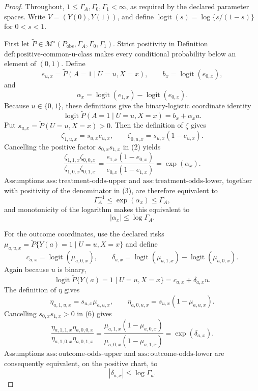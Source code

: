 \documentclass{article}
\begin{document}
\begin{proof}
Throughout, \(1\leq\Gamma_A,\Gamma_0,\Gamma_1<\infty\), as required by the declared parameter spaces.  Write \(V=(Y(0),Y(1))\), and define \(\operatorname{logit}(s)=\log\{s/(1-s)\}\) for \(0<s<1\).

First let \(\widetilde P\in\mathcal M^{\circ}(P_{\mathrm{obs}},\Gamma_A,\Gamma_0,\Gamma_1)\).  Strict positivity in Definition \(\mathrm{def{:}positive\text{-}common\text{-}u\text{-}class}\) makes every conditional probability below an element of \((0,1)\).  Define
\[
e_{u,x}=\widetilde P(A=1\mid U=u,X=x),
\qquad
b_x=\operatorname{logit}(e_{0,x}),
\]
and
\[
\alpha_x=\operatorname{logit}(e_{1,x})-
          \operatorname{logit}(e_{0,x}).
\]
Because \(u\in\{0,1\}\), these definitions give the binary-logistic coordinate identity
\[
\operatorname{logit}\widetilde P(A=1\mid U=u,X=x)
=b_x+\alpha_xu.                                           \tag{1}
\]
Put \(s_{u,x}=\widetilde P(U=u,X=x)>0\).  Then the definition of \(\zeta\) gives
\[
\zeta_{1,u,x}=s_{u,x}e_{u,x},
\qquad
\zeta_{0,u,x}=s_{u,x}(1-e_{u,x}).                         \tag{2}
\]
Cancelling the positive factor \(s_{0,x}s_{1,x}\) in (2) yields
\[
\frac{\zeta_{1,1,x}\zeta_{0,0,x}}
     {\zeta_{1,0,x}\zeta_{0,1,x}}
=\frac{e_{1,x}(1-e_{0,x})}{e_{0,x}(1-e_{1,x})}
=\exp(\alpha_x).                                          \tag{3}
\]
Assumptions \(\mathrm{ass{:}treatment\text{-}odds\text{-}upper}\) and \(\mathrm{ass{:}treatment\text{-}odds\text{-}lower}\), together with positivity of the denominator in (3), are therefore equivalent to
\[
\Gamma_A^{-1}\leq\exp(\alpha_x)\leq\Gamma_A,
\]
and monotonicity of the logarithm makes this equivalent to
\[
|\alpha_x|\leq\log\Gamma_A.                              \tag{4}
\]

For the outcome coordinates, use the declared risks
\(\mu_{a,u,x}=\widetilde P\{Y(a)=1\mid U=u,X=x\}\) and define
\[
c_{a,x}=\operatorname{logit}(\mu_{a,0,x}),
\qquad
\delta_{a,x}=\operatorname{logit}(\mu_{a,1,x})-
              \operatorname{logit}(\mu_{a,0,x}).
\]
Again because \(u\) is binary,
\[
\operatorname{logit}\widetilde P\{Y(a)=1\mid U=u,X=x\}
=c_{a,x}+\delta_{a,x}u.                                   \tag{5}
\]
The definition of \(\eta\) gives
\[
\eta_{a,1,u,x}=s_{u,x}\mu_{a,u,x},
\qquad
\eta_{a,0,u,x}=s_{u,x}(1-\mu_{a,u,x}).                   \tag{6}
\]
Cancelling \(s_{0,x}s_{1,x}>0\) in (6) gives
\[
\frac{\eta_{a,1,1,x}\eta_{a,0,0,x}}
     {\eta_{a,1,0,x}\eta_{a,0,1,x}}
=\frac{\mu_{a,1,x}(1-\mu_{a,0,x})}
       {\mu_{a,0,x}(1-\mu_{a,1,x})}
=\exp(\delta_{a,x}).                                     \tag{7}
\]
Assumptions \(\mathrm{ass{:}outcome\text{-}odds\text{-}upper}\) and \(\mathrm{ass{:}outcome\text{-}odds\text{-}lower}\) are consequently equivalent, on the positive chart, to
\[
|\delta_{a,x}|\leq\log\Gamma_a.                          \tag{8}
\]


\end{proof}
\end{document}
